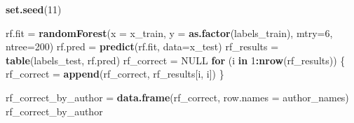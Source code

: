 \documentclass[]{article}
\newenvironment{Shaded}{\begin{snugshade}}{\end{snugshade}}
\newcommand{\KeywordTok}[1]{\textcolor[rgb]{0.13,0.29,0.53}{\textbf{#1}}}
\newcommand{\DataTypeTok}[1]{\textcolor[rgb]{0.13,0.29,0.53}{#1}}
\newcommand{\DecValTok}[1]{\textcolor[rgb]{0.00,0.00,0.81}{#1}}
\newcommand{\StringTok}[1]{\textcolor[rgb]{0.31,0.60,0.02}{#1}}
\newcommand{\OtherTok}[1]{\textcolor[rgb]{0.56,0.35,0.01}{#1}}
\newcommand{\ControlFlowTok}[1]{\textcolor[rgb]{0.13,0.29,0.53}{\textbf{#1}}}
\newcommand{\OperatorTok}[1]{\textcolor[rgb]{0.81,0.36,0.00}{\textbf{#1}}}
\newcommand{\NormalTok}[1]{#1}
\begin{document}
\begin{Shaded}
\begin{Highlighting}[]
\KeywordTok{set.seed}\NormalTok{(}\DecValTok{11}\NormalTok{)}

\NormalTok{rf.fit =}\StringTok{ }\KeywordTok{randomForest}\NormalTok{(}\DataTypeTok{x =}\NormalTok{ x_train, }\DataTypeTok{y =} \KeywordTok{as.factor}\NormalTok{(labels_train), }\DataTypeTok{mtry=}\DecValTok{6}\NormalTok{, }\DataTypeTok{ntree=}\DecValTok{200}\NormalTok{)}
\NormalTok{rf.pred =}\StringTok{ }\KeywordTok{predict}\NormalTok{(rf.fit, }\DataTypeTok{data=}\NormalTok{x_test)}
\NormalTok{rf_results =}\StringTok{ }\KeywordTok{table}\NormalTok{(labels_test, rf.pred)}
\NormalTok{rf_correct =}\StringTok{ }\OtherTok{NULL}
\ControlFlowTok{for}\NormalTok{ (i }\ControlFlowTok{in} \DecValTok{1}\OperatorTok{:}\KeywordTok{nrow}\NormalTok{(rf_results)) \{}
\NormalTok{  rf_correct =}\StringTok{ }\KeywordTok{append}\NormalTok{(rf_correct, rf_results[i, i])}
\NormalTok{\}}

\NormalTok{rf_correct_by_author =}\StringTok{ }\KeywordTok{data.frame}\NormalTok{(rf_correct, }\DataTypeTok{row.names =}\NormalTok{ author_names)}
\NormalTok{rf_correct_by_author}
\end{Highlighting}
\end{Shaded}
\end{document}
